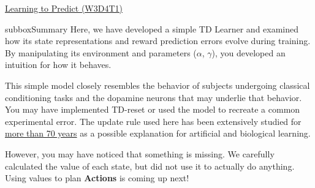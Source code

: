 \begin{textbox}{\href{https://compneuro.neuromatch.io/tutorials/W3D4_ReinforcementLearning/student/W3D4_Tutorial1.html}{Learning to Predict (W3D4T1)} }
\begin{subbox}{subbox}{Summary}
\scriptsize
Here, we have developed a simple TD Learner and examined how its state representations and reward prediction errors evolve during training. By manipulating its environment and parameters ($\alpha$, $\gamma$), you developed an intuition for how it behaves. 

This simple model closely resembles the behavior of subjects undergoing classical conditioning tasks and the dopamine neurons that may underlie that behavior. You may have implemented TD-reset or used the model to recreate a common experimental error. The update rule used here has been extensively studied for \href{https://www.pnas.org/content/108/Supplement_3/15647}{more than 70 years} as a possible explanation for artificial and biological learning. 

However, you may have noticed that something is missing. We carefully calculated the value of each state, but did not use it to actually do anything. Using values to plan \textbf{Actions} is coming up next!

\end{subbox}
\end{textbox}
\newpage
